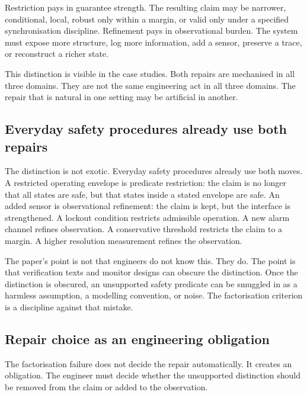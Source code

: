 \documentclass[a4paper,11pt]{article}
\begin{document}
Restriction pays in guarantee strength. The resulting claim may be narrower,
conditional, local, robust only within a margin, or valid only under a specified
synchronisation discipline. Refinement pays in observational burden. The system
must expose more structure, log more information, add a sensor, preserve a
trace, or reconstruct a richer state.

This distinction is visible in the case studies. Both repairs are mechanised in
all three domains. They are not the same engineering act in all three domains.
The repair that is natural in one setting may be artificial in another.

\subsection{Everyday safety procedures already use both repairs}
\label{subsec:safety-practice}

The distinction is not exotic. Everyday safety procedures already use both
moves. A restricted operating envelope is predicate restriction: the claim is no
longer that all states are safe, but that states inside a stated envelope are
safe. An added sensor is observational refinement: the claim is kept, but the
interface is strengthened. A lockout condition restricts admissible operation. A
new alarm channel refines observation. A conservative threshold restricts the
claim to a margin. A higher resolution measurement refines the observation.

The paper's point is not that engineers do not know this. They do. The point is
that verification texts and monitor designs can obscure the distinction. Once
the distinction is obscured, an unsupported safety predicate can be smuggled in
as a harmless assumption, a modelling convention, or noise. The factorisation
criterion is a discipline against that mistake.

\subsection{Repair choice as an engineering obligation}
\label{subsec:repair-obligation}

The factorisation failure does not decide the repair automatically.  It
creates an obligation.  The engineer must decide whether the unsupported
distinction should be removed from the claim or added to the observation.
\end{document}

